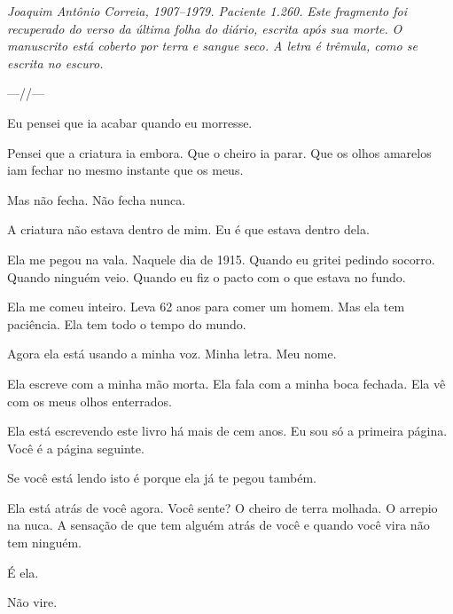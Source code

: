 
\noindent \textit{Joaquim Antônio Correia, 1907--1979. Paciente 1.260.}
\textit{Este fragmento foi recuperado do verso da última folha do diário, escrita após sua morte.}
\textit{O manuscrito está coberto por terra e sangue seco. A letra é trêmula, como se escrita no escuro.}

\noindent ---//---

\noindent Eu pensei que ia acabar quando eu morresse.

\noindent Pensei que a criatura ia embora. Que o cheiro ia parar. Que os olhos amarelos iam fechar no mesmo instante que os meus.

\noindent Mas não fecha. Não fecha nunca.

\noindent A criatura não estava dentro de mim. Eu é que estava dentro dela.

\noindent Ela me pegou na vala. Naquele dia de 1915. Quando eu gritei pedindo socorro. Quando ninguém veio. Quando eu fiz o pacto com o que estava no fundo.

\noindent Ela me comeu inteiro. Leva 62 anos para comer um homem. Mas ela tem paciência. Ela tem todo o tempo do mundo.

\noindent Agora ela está usando a minha voz. Minha letra. Meu nome.

\noindent Ela escreve com a minha mão morta. Ela fala com a minha boca fechada. Ela vê com os meus olhos enterrados.

\noindent Ela está escrevendo este livro há mais de cem anos. Eu sou só a primeira página. Você é a página seguinte.

\noindent Se você está lendo isto é porque ela já te pegou também.

\noindent Ela está atrás de você agora. Você sente? O cheiro de terra molhada. O arrepio na nuca. A sensação de que tem alguém atrás de você e quando você vira não tem ninguém.

\noindent É ela.

\noindent Não vire.


